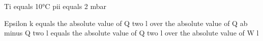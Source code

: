 Ti equals 10°C  
pii equals 2 mbar

Epsilon k equals the absolute value of Q two l over the absolute value of Q ab minus Q two l equals the absolute value of Q two l over the absolute value of W l